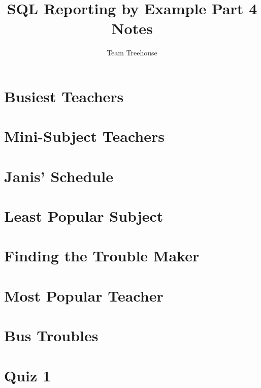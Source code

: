 \documentclass[12pt]{article}
\begin{document}
\title{SQL Reporting by Example Part 4 Notes}
\author{Team Treehouse}
\maketitle

\bigskip

\section{Busiest Teachers}

\bigskip

\section{Mini-Subject Teachers}

\bigskip

\section{Janis' Schedule}

\bigskip

\section{Least Popular Subject}

\bigskip

\section{Finding the Trouble Maker}

\bigskip

\section{Most Popular Teacher}

\bigskip

\section{Bus Troubles}

\bigskip

\section{Quiz 1}

\bigskip
\end{document}
